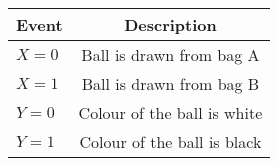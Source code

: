 \begin{tabular}{|l|c|}

\hline
\textbf{Event} & \textbf{Description} \\
\hline
$X = 0$ &  Ball is drawn from bag A \\
\hline
$X = 1$ &  Ball is drawn from bag B  \\
\hline
$Y = 0$ &  Colour of the ball is white \\
\hline
$Y = 1$ &  Colour of the ball is black\\
\hline
\end{tabular}